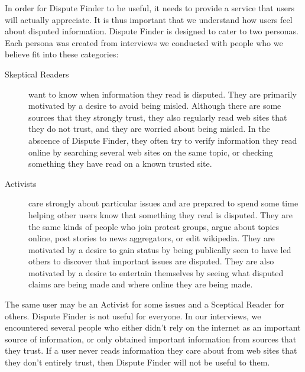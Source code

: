 \documentclass{www2010-submission}
\newcommand{\todo}[1]{}
\begin{document}
In order for Dispute Finder to be useful, it needs to provide a service that users will actually appreciate. It is thus important that we understand how users feel about disputed information. Dispute Finder is designed to cater to two personas. Each persona was created from interviews we conducted with people who we believe fit into these categories:

\todo{Use interviews to get some actual observations here. These are just fillers.}

\begin{description}

\item[Skeptical Readers] want to know when information they read is disputed. They are primarily motivated by a desire to avoid being misled. Although there are some sources that they strongly trust, they also regularly read web sites that they do not trust, and they are worried about being misled. In the abscence of Dispute Finder, they often try to verify information they read online by searching several web sites on the same topic, or checking something they have read on a known trusted site.

\item[Activists] care strongly about particular issues and are prepared to spend some time helping other users know that something they read is disputed. They are the same kinds of people who join protest groups, argue about topics online, post stories to news aggregators, or edit wikipedia. They are motivated by a desire to gain status by being publically seen to have led others to discover that important issues are disputed. They are also motivated by a desire to entertain themselves by seeing what disputed claims are being made and where online they are being made.

\end{description}

\todo{Improve the paraphraser UI so it shows users what pages are making the claim}
\todo{Improve the ``see examples on the web'' UI to it shows the pages that were found with the activists training work}
\todo{Provide a customized RSS reader and search engine that does dispute tracking. - future work?}

The same user may be an Activist for some issues and a Sceptical Reader for others. Dispute Finder is not useful for everyone. In our interviews, we encountered several people who either didn't rely on the internet as an important source of information, or only obtained important information from sources that they trust. If a user never reads information they care about from web sites that they don't entirely trust, then Dispute Finder will not be useful to them.
\end{document}
